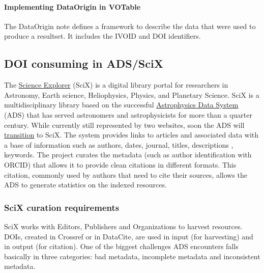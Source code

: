 \documentclass[11pt,a4paper]{ivoa}
\begin{document}
\paragraph{Implementing DataOrigin in VOTable}
The DataOrigin note \citep{note:dataorigin} defines a framework to describe the data that were used to produce a resultset. It includes the IVOID and DOI identifiers.

\subsection{DOI consuming in ADS/SciX}\hypertarget{doi-consuming-in-adsscix}{}\label{doi-consuming-in-adsscix}

The \href{https://www.scixplorer.org/}{Science Explorer} (SciX) \citep{2025AAS...24544204B} is a digital library portal for researchers in Astronomy, Earth science, Heliophysics, Physics, and Planetary Science. SciX is a multidisciplinary library based on the successful \href{https://ui.adsabs.harvard.edu/}{Astrophysics Data System} (ADS) that has served astronomers and astrophysicists for more than a quarter century. While currently still represented by two websites, soon the ADS will \href{https://scixplorer.org/adstoscix}{transition} to SciX. The system provides links to articles and associated data with a base of information such as authors, dates, journal, titles, descriptions , keywords. The project curates the metadata (such as author identification with ORCID) that allows it to provide clean citations in different formats. This citation, commonly used by authors that need to cite their sources, allows the ADS to generate statistics on the indexed resources.

\subsubsection{SciX curation requirements}\hypertarget{scix-curation-requirements}{}\label{sec:scix-curation-requirements}

SciX works with Editors, Publishers and Organizations to harvest resources. DOIs, created in Crossref or in DataCite, are used in input (for harvesting) and in output (for citation). One of the biggest challenges ADS encounters falls basically in three categories:  bad metadata, incomplete metadata and inconsistent metadata.
\end{document}

